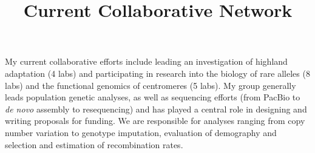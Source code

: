 \documentclass[11pt,letterpaper]{article}
\title{Current Collaborative Network}
\date{}
\begin{document}
\maketitle
\noindent My current collaborative efforts include leading an investigation of highland adaptation (4 labs) and participating in research into the biology of rare alleles (8 labs) and the functional genomics of centromeres (5 labs). 
My group generally leads population genetic analyses, as well as sequencing efforts (from PacBio to \emph{de novo} assembly to resequencing) and has played a central role in designing and writing proposals for funding. We are responsible for analyses ranging from copy number variation to genotype imputation, evaluation of demography and selection and estimation of recombination rates.
\end{document}
